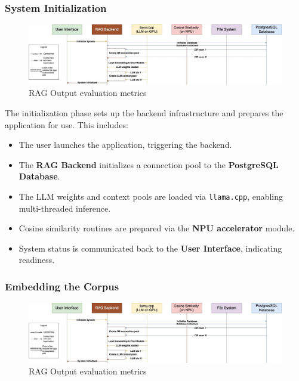 \subsubsection{System Initialization}
\label{subsec:AppDesignWorkflow-SystemInitialization}

\begin{figure}[H]
    \centering
    \includegraphics[width=1.0\linewidth]{images/tldr-app-worklfow-pt1.jpg}
    \caption{RAG Output evaluation metrics ~\cite{cardenas2023rag}}
    \label{fig:autoregressive_decoding}
\end{figure}


The initialization phase sets up the backend infrastructure and prepares the application for use. This includes:

\begin{itemize}
    \item The user launches the application, triggering the backend.
    \item The \textbf{RAG Backend} initializes a connection pool to the \textbf{PostgreSQL Database}.
    \item The LLM weights and context pools are loaded via \texttt{llama.cpp}, enabling multi-threaded inference.
    \item Cosine similarity routines are prepared via the \textbf{NPU accelerator} module.
    \item System status is communicated back to the \textbf{User Interface}, indicating readiness.
\end{itemize}


\subsubsection{Embedding the Corpus}
\label{subsec:AppDesignWorkflow-EmbeddingCorpus}

\begin{figure}[H]
    \centering
    \includegraphics[width=1.0\linewidth]{images/tldr-app-worklfow-pt1.jpg}
    \caption{RAG Output evaluation metrics ~\cite{cardenas2023rag}}
    \label{fig:autoregressive_decoding}
\end{figure}


